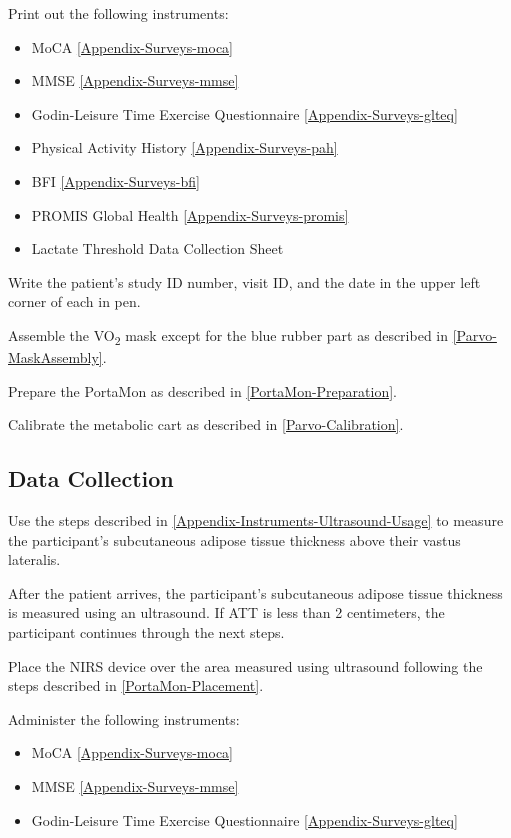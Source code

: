 \documentclass[
]{book}
\providecommand{\tightlist}{%
  \setlength{\itemsep}{0pt}\setlength{\parskip}{0pt}}
\begin{document}
Print out the following instruments:

\begin{itemize}
\tightlist
\item
  MoCA \ref{Appendix-Surveys-moca}
\item
  MMSE \ref{Appendix-Surveys-mmse}
\item
  Godin-Leisure Time Exercise Questionnaire \ref{Appendix-Surveys-glteq}
\item
  Physical Activity History \ref{Appendix-Surveys-pah}
\item
  BFI \ref{Appendix-Surveys-bfi}
\item
  PROMIS Global Health \ref{Appendix-Surveys-promis}
\item
  Lactate Threshold Data Collection Sheet
\end{itemize}

Write the patient's study ID number, visit ID, and the date in the upper left corner of each in pen.

Assemble the VO\textsubscript{2} mask except for the blue rubber part as described in \ref{Parvo-MaskAssembly}.

Prepare the PortaMon as described in \ref{PortaMon-Preparation}.

Calibrate the metabolic cart as described in \ref{Parvo-Calibration}.

\hypertarget{Methods-LT-DataCollection}{%
\subsection{Data Collection}\label{Methods-LT-DataCollection}}

Use the steps described in \ref{Appendix-Instruments-Ultrasound-Usage} to measure the participant's subcutaneous adipose tissue thickness above their vastus lateralis.

After the patient arrives, the participant's subcutaneous adipose tissue thickness is measured using an ultrasound. If ATT is less than 2 centimeters, the participant continues through the next steps.

Place the NIRS device over the area measured using ultrasound following the steps described in \ref{PortaMon-Placement}.

Administer the following instruments:

\begin{itemize}
\tightlist
\item
  MoCA \ref{Appendix-Surveys-moca}
\item
  MMSE \ref{Appendix-Surveys-mmse}
\item
  Godin-Leisure Time Exercise Questionnaire \ref{Appendix-Surveys-glteq}
\end{itemize}
\end{document}
